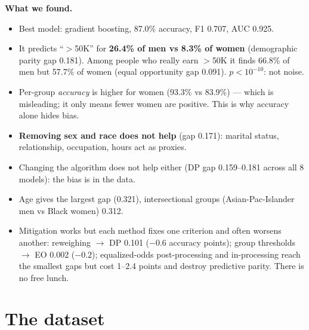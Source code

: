 \documentclass[11pt,a4paper]{article}
\begin{document}
\textbf{What we found.}
\begin{itemize}
  \item Best model: gradient boosting, 87.0\% accuracy, F1 0.707, AUC 0.925.
  \item It predicts ``$>$50K'' for \textbf{26.4\% of men vs 8.3\% of women} (demographic parity gap 0.181). Among people who really earn $>$50K it finds 66.8\% of men but 57.7\% of women (equal opportunity gap 0.091). $p<10^{-10}$: not noise.
  \item Per-group \emph{accuracy} is higher for women (93.3\% vs 83.9\%) --- which is misleading; it only means fewer women are positive. This is why accuracy alone hides bias.
  \item \textbf{Removing sex and race does not help} (gap 0.171): marital status, relationship, occupation, hours act as proxies.
  \item Changing the algorithm does not help either (DP gap 0.159--0.181 across all 8 models): the bias is in the data.
  \item Age gives the largest gap (0.321), intersectional groups (Asian-Pac-Islander men vs Black women) 0.312.
  \item Mitigation works but each method fixes one criterion and often worsens another: reweighing $\to$ DP 0.101 ($-0.6$ accuracy points); group thresholds $\to$ EO 0.002 ($-0.2$); equalized-odds post-processing and in-processing reach the smallest gaps but cost 1--2.4 points and destroy predictive parity. There is no free lunch.
\end{itemize}

\section{The dataset}
\end{document}
